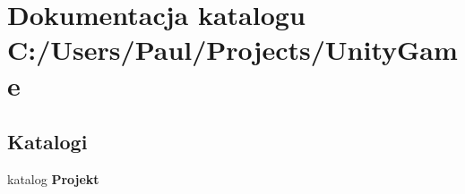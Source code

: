 \section{Dokumentacja katalogu C\+:/\+Users/\+Paul/\+Projects/\+Unity\+Game}
\label{dir_f9336268373bf4492516c8d52bf3ed18}
\subsection*{Katalogi}
\begin{DoxyCompactItemize}
\item 
katalog {\bf Projekt}
\end{DoxyCompactItemize}
